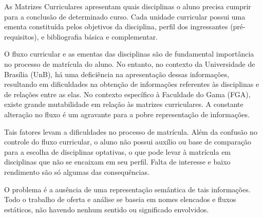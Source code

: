 
As Matrizes Curriculares apresentam quais disciplinas o aluno precisa cumprir para a conclusão de determinado curso. Cada unidade curricular possui uma ementa constituída pelos objetivos da disciplina, perfil dos ingressantes (pré-requisitos), e bibliografia básica e complementar. 

O fluxo curricular e as ementas das disciplinas são de fundamental importância no processo de matrícula do aluno. No entanto, no contexto da Universidade de Brasília (UnB), há uma deficiência na apresentação dessas informações, resultando em dificuldades na obtenção de informações referentes às disciplinas e de relações entre as elas. No contexto específico à Faculdade do Gama (FGA), existe grande mutabilidade em relação às matrizes curriculares. A constante alteração no fluxo é um agravante para a pobre representação de informações. 

Tais fatores levam a dificuldades no processo de matrícula. Além da confusão no controle do fluxo curricular, o aluno não possui auxílio ou base de comparação para a escolha de disciplinas optativas, o que pode levar à matrícula em disciplinas que não se encaixam em seu perfil. Falta de interesse e baixo rendimento são só algumas das consequências.

O problema é a ausência de uma representação semântica de tais informações. Todo o trabalho de oferta e análise se baseia em nomes elencados e fluxos estáticos, não havendo nenhum sentido ou significado envolvidos. 
